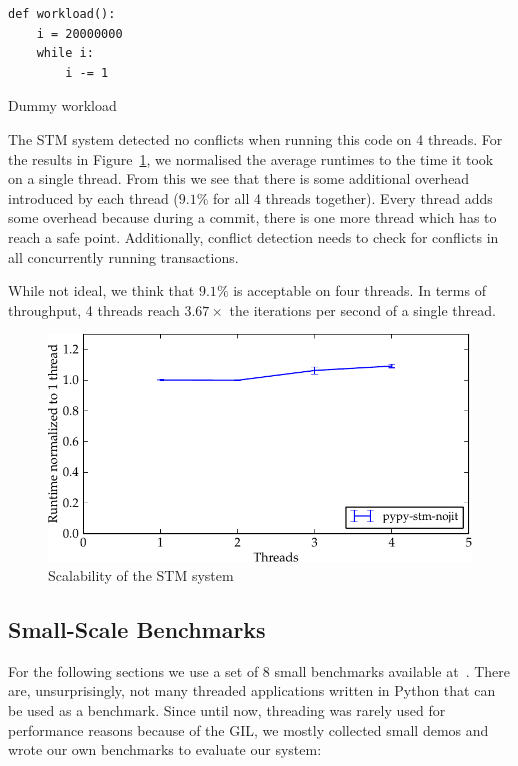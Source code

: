 \documentclass{sigplanconf}
\begin{document}
\begin{code}[h]
\begin{lstlisting}
def workload():
    i = 20000000
    while i:
        i -= 1
\end{lstlisting}
\caption{Dummy workload\label{lst:scaling_workload}}
\end{code}

The STM system detected no conflicts when running this code on 4
threads. For the results in Figure~\ref{fig:scaling}, we
normalised the average runtimes to the time it took on a single
thread. From this we see that there is some additional overhead introduced
by each thread ($9.1\%$ for all 4 threads together). Every thread
adds some overhead because during a commit, there is one more thread
which has to reach a safe point. Additionally, conflict detection
needs to check for conflicts in all concurrently running transactions.

While not ideal, we think that $9.1\%$ is acceptable on four
threads. In terms of throughput, 4 threads reach $3.67\times$
the iterations per second of a single thread.

\begin{figure}[h]
  \centering
  \includegraphics[width=1\columnwidth]{plots/scaling.pdf}
  \caption{Scalability of the STM system\label{fig:scaling}}
\end{figure}


\subsection{Small-Scale Benchmarks\label{sec:performance-bench}}

For the following sections we use a set of 8 small benchmarks
available at~\cite{pypybenchs}. There are, unsurprisingly, not
many threaded applications written in Python that can be used
as a benchmark. Since until now, threading was rarely used
for performance reasons because of the GIL, we mostly collected
small demos and wrote our own benchmarks to evaluate our system:
\end{document}
